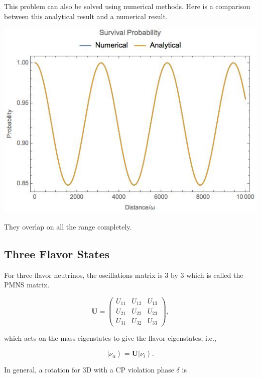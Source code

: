 \documentclass{tufte-handout}
\newcommand{\ket}[1]{\left| #1\right\rangle}
\begin{document}
This problem can also be solved using numerical methods. Here is a comparison between this analytical result and a numerical result.

\begin{marginfigure}
\includegraphics{assets/vacuumOsc}
\caption{They overlap on all the range completely.}
\end{marginfigure}




\subsection{Three Flavor States}

For three flavor neutrinos, the oscillations matrix is 3 by 3 which is called the PMNS matrix.

\begin{equation*}
\mathbf U = \begin{pmatrix}
U_{11} & U_{12} & U_{13} \\
U_{21} & U_{22} & U_{23} \\
U_{31} & U_{32} & U_{33}
\end{pmatrix},
\end{equation*}

which acts on the mass eigenstates to give the flavor eigenstates, i.e.,

\begin{equation*}
\ket{\nu_\alpha}= \mathbf{U}\ket{\nu_i}.
\end{equation*}




In general, a rotation for 3D with a CP violation phase $\delta$ is
\end{document}
